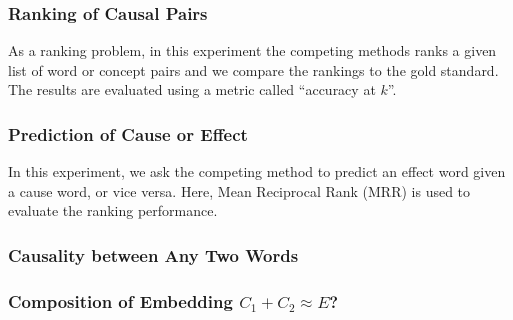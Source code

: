 \subsubsection{Ranking of Causal Pairs}
As a ranking problem, in this experiment the competing methods
ranks a given list of word or concept pairs and we compare the rankings
to the gold standard. The results are evaluated using a metric called
``accuracy at $k$''.

\subsubsection{Prediction of Cause or Effect}
In this experiment, we ask the competing method to predict an effect word
given a cause word, or vice versa. Here, Mean Reciprocal Rank (MRR) is used
to evaluate the ranking performance. 

\subsubsection{Causality between Any Two Words}

\subsubsection{Composition of Embedding $C_1 + C_2 \approx E$?} 


%
%
% 

